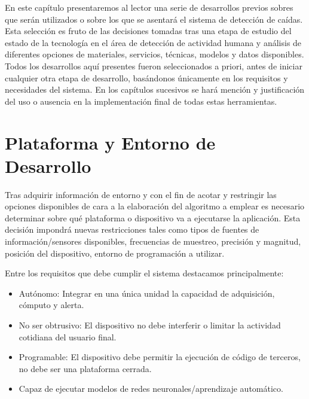 
\begin{comment}
info{Indicar el trabajo previo realizado para guiar el desarrollo del software.
Debe identificar adecuadamente el problema a tratar, contexto adecuado de uso y funcionamiento de la aplicación. Idealmente se debería realizar con expertos en la materia a tratar.}

todo{referenciar los requisitos de un sistema de detección de caídas, en detalle si es posible}
\end{comment}

En este capítulo presentaremos al lector una serie de desarrollos previos sobres que serán utilizados o sobre los que se asentará el sistema de detección de caídas. Esta selección es fruto de las decisiones tomadas tras una etapa de estudio del estado de la tecnología en el área de detección de actividad humana y análisis de diferentes opciones de materiales, servicios, técnicas, modelos y datos disponibles. Todos los desarrollos aquí presentes fueron seleccionados a priori, antes de iniciar cualquier otra etapa de desarrollo, basándonos únicamente en los requisitos y necesidades del sistema. En los capítulos sucesivos se hará mención y justificación del uso o ausencia en la implementación final de todas estas herramientas.

\section{Plataforma y Entorno de Desarrollo}\label{sec:req:plataforma}

Tras adquirir información de entorno y con el fin de acotar y restringir las opciones disponibles de cara a la elaboración del algoritmo a emplear es necesario determinar sobre qué plataforma o dispositivo va a ejecutarse la aplicación. Esta decisión impondrá nuevas restricciones tales como tipos de fuentes de información/sensores disponibles, frecuencias de muestreo, precisión y magnitud, posición del dispositivo, entorno de programación a utilizar.

Entre los requisitos que debe cumplir el sistema destacamos principalmente:

\begin{itemize}
  \item Autónomo: Integrar en una única unidad la capacidad de adquisición, cómputo y alerta.
  \item No ser obtrusivo: El dispositivo no debe interferir o limitar la actividad cotidiana del usuario final.
  \item Programable: El dispositivo debe permitir la ejecución de código de terceros, no debe ser una plataforma cerrada.
  \item Capaz de ejecutar modelos de redes neuronales/aprendizaje automático.
\end{itemize}

